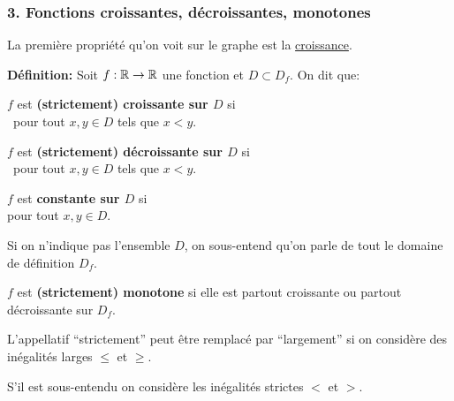 \begin{frame}[plain]
\frametitle{\bf 3. Fonctions croissantes, d\'ecroissantes, monotones}
\medskip 

{\small 
La premi\`ere propri\'et\'e qu'on voit sur le graphe est la 
\underline{croissance}.}
\vspace*{2mm}

{\bf D\'efinition:} 
Soit $f:\mathbb R\rightarrow\mathbb R$ une fonction et $D\subset D_f$. On dit que: 
\vspace*{1mm}

\begin{itemize}
\bitem
\parbox[t]{7.5cm}{
$f$ est {\bf (strictement) croissante sur $D$} si\\ 
\ pour tout $x,y\in D$ tels que $x<y$. 
}
\quad
\raisebox{-.7\height}{\croissant}  
\vspace*{1mm}

\bitem
\parbox[t]{7.5cm}{
$f$ est {\bf (strictement) d\'ecroissante sur $D$} si\\ 
\ pour tout $x,y\in D$ tels que $x<y$.
}
\quad
\raisebox{-.7\height}{\decroissant}  
\vspace*{1mm}

\bitem
\parbox[t]{7.5cm}{
$f$ est {\bf constante sur $D$} si\ \\ 
pour tout $x,y\in D$.
}
\quad
\raisebox{-.7\height}{\constant}  
\end{itemize} 
\vspace*{1mm}

\pause
{\small
Si on n'indique pas l'ensemble $D$, on sous-entend qu'on parle de tout le 
domaine de d\'efinition $D_f$.
} 
\vspace*{2mm}

\pause
\begin{itemize}
\bitem
$f$ est {\bf (strictement) monotone} si elle est partout croissante 
ou partout d\'ecroissante sur $D_f$.
\end{itemize} 
\vspace*{2mm}

\pause
{\small
L'appellatif ``strictement'' peut \^etre remplac\'e par ``largement'' 
si on consid\`ere des in\'egalit\'es larges $\leq$ et $\geq$. 

S'il est sous-entendu on consid\`ere les in\'egalit\'es strictes $<$ et $>$.
}

\end{frame}


